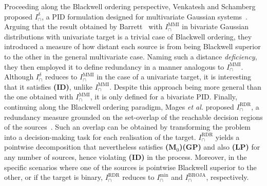 \documentclass{article}
\makeatletter
\newcommand{\etal}{\textit{et al.\@} }
\newcommand{\ts}[1]{\ensuremath{_{\text{#1}}}}
\newcommand{\Mz}{\textbf{(M\ts{0})}\xspace} %
\newcommand{\GP}{\textbf{(GP)}\xspace} %
\newcommand{\ID}{\textbf{(ID)}\xspace} %
\newcommand{\LP}{\textbf{(LP)}\xspace}
\newcommand{\Imin}{\ensuremath{I_\cap^{\text{min}}}\xspace}
\newcommand{\IBROJA}{\ensuremath{I_\cap^{\text{BROJA}}}\xspace}
\newcommand{\IMMI}{\ensuremath{I_\cap^{\text{MMI}}}\xspace}
\newcommand{\Idelta}{\ensuremath{I_\cap^{\delta}}\xspace}
\newcommand{\IRDR}{\ensuremath{I_\cap^{\text{RDR}}}\xspace}
\makeatother
\begin{document}
Proceeding along the Blackwell ordering perspective, Venkatesh and Schamberg proposed \Idelta, a PID formulation designed for multivariate Gaussian systems~\cite{venkatesh2022partial}. Arguing that the result obtained by Barrett~\cite{barrett2015exploration} with \IMMI in bivariate Gaussian distributions with univariate target is a trivial case of Blackwell ordering, they introduced a measure of how distant each source is from being Blackwell superior to the other in the general multivariate case. Naming such a distance \textit{deficiency}, they then employed it to define redundancy in a manner analogous to \IMMI. Although \Idelta reduces to \IMMI in the case of a univariate target, it is interesting that it satisfies \ID, unlike \IMMI. Despite this approach being more general than the one obtained with \IMMI, it is only defined for a bivariate PID. 
Finally, continuing along the Blackwell ordering paradigm, Mages \etal proposed \IRDR, a redundancy measure grounded on the set-overlap of the reachable decision regions of the sources~\cite{mages2023decomposing}. Such an overlap can be obtained by transforming the problem into a decision-making task for each realisation of the target. \IRDR yields a pointwise decomposition that nevertheless satisfies \Mz \GP and also \LP for any number of sources, hence violating \ID in the process. Moreover, in the specific scenarios where one of the sources is pointwise Blackwell superior to the other, or if the target is binary, \IRDR reduces to \Imin and \IBROJA, respectively.
\end{document}

